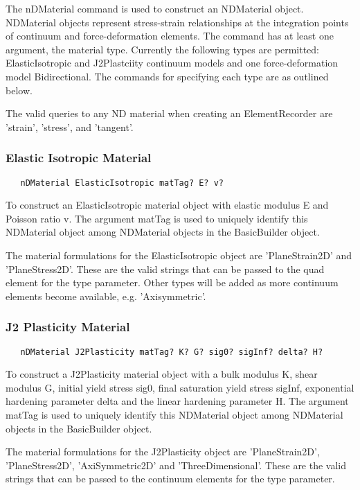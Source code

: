 \documentclass[12pt]{article}
\begin{document}
The nDMaterial command is used to construct an NDMaterial object. NDMaterial
objects represent stress-strain relationships at the integration points of
continuum and force-deformation elements. The command has at least one
argument, the material type. Currently the following types are
permitted: ElasticIsotropic and J2Plastciity continuum models and one
force-deformation model Bidirectional. The commands for specifying
each type are as outlined below.  

The valid queries to any ND material when creating an ElementRecorder
are 'strain', 'stress', and 'tangent'.

\subsubsection{Elastic Isotropic Material}
{\sf\small
\begin{verbatim}
   nDMaterial ElasticIsotropic matTag? E? v?
\end{verbatim}
}

To construct an ElasticIsotropic material object with elastic modulus
E and Poisson ratio v. The argument matTag is used to
uniquely identify this NDMaterial object among NDMaterial objects
in the BasicBuilder object.

The material formulations for the ElasticIsotropic object are 'PlaneStrain2D' and
'PlaneStress2D'. These are the valid strings that can be passed to the quad
element for the type parameter. Other types will be added as more
continuum elements become available, e.g. 'Axisymmetric'.

\subsubsection{J2 Plasticity Material}
{\sf\small
\begin{verbatim}
   nDMaterial J2Plasticity matTag? K? G? sig0? sigInf? delta? H?
\end{verbatim}
}

To construct a J2Plasticity material object with a bulk modulus
K, shear modulus G, initial yield stress sig0, final saturation yield
stress sigInf, exponential hardening parameter delta and the linear
hardening parameter H. The argument matTag is used to uniquely
identify this NDMaterial object among NDMaterial objects in the
BasicBuilder object. 

The material formulations for the J2Plasticity object are 'PlaneStrain2D',
'PlaneStress2D', 'AxiSymmetric2D' and 'ThreeDimensional'.  These are
the valid strings that can be passed to the continuum elements for the type
parameter. 
\end{document}
